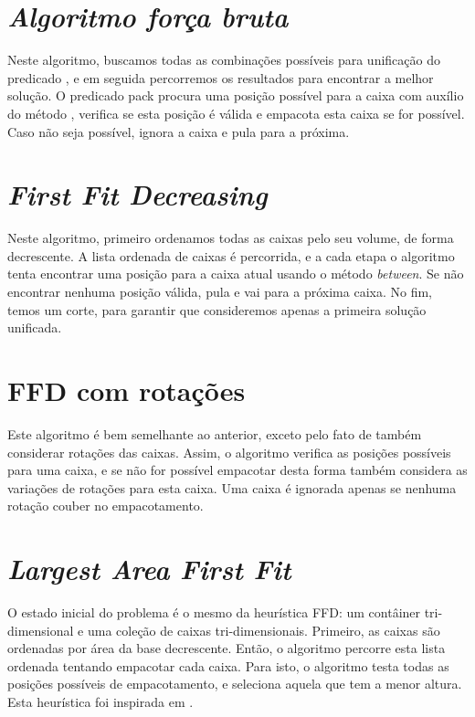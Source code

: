 \documentclass[12pt]{article}
\begin{document}
\section{\emph{Algoritmo força bruta}}

Neste algoritmo, buscamos todas as combinações possíveis para unificação do predicado , e em seguida percorremos os resultados para encontrar a melhor solução. O predicado pack procura uma posição possível para a caixa com auxílio do método , verifica se esta posição é válida e empacota esta caixa se for possível. Caso não seja possível, ignora a caixa e pula para a próxima.

\section{\emph{First Fit Decreasing}}

Neste algoritmo, primeiro ordenamos todas as caixas pelo seu volume, de forma decrescente. A lista ordenada de caixas é percorrida, e a cada etapa o algoritmo tenta encontrar uma posição para a caixa atual usando o método \emph{between}. Se não encontrar nenhuma posição válida, pula e vai para a próxima caixa. No fim, temos um corte, para garantir que consideremos apenas a primeira solução unificada.

\section{FFD com rotações}

Este algoritmo é bem semelhante ao anterior, exceto pelo fato de também considerar rotações das caixas. Assim, o algoritmo verifica as posições possíveis para uma caixa, e se não for possível empacotar desta forma também considera as variações de rotações para esta caixa. Uma caixa é ignorada apenas se nenhuma rotação couber no empacotamento.

\section{\emph{Largest Area First Fit}}

O estado inicial do problema é o mesmo da heurística FFD: um contâiner tri-dimensional e uma coleção de caixas tri-dimensionais. Primeiro, as caixas são ordenadas por área da base decrescente. Então, o algoritmo percorre esta lista ordenada tentando empacotar cada caixa. Para isto, o algoritmo testa todas as posições possíveis de empacotamento, e seleciona aquela que tem a menor altura. Esta heurística foi inspirada em \cite{gurbuz}.
\end{document}
